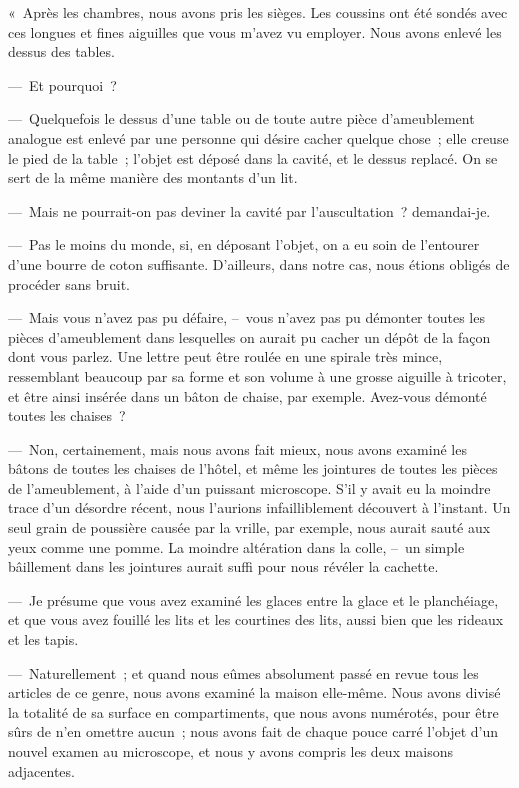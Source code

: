 \documentclass[french,twoside]{book} %
\begin{document}
« Après les chambres, nous avons pris les sièges. Les coussins ont été sondés avec ces longues et fines aiguilles que vous m’avez vu employer. Nous avons enlevé les dessus des tables.\par
— Et pourquoi ?\par
— Quelquefois le dessus d’une table ou de toute autre pièce d’ameublement analogue est enlevé par une personne qui désire cacher quelque chose ; elle creuse le pied de la table ; l’objet est déposé dans la cavité, et le dessus replacé. On se sert de la même manière des montants d’un lit.\par
— Mais ne pourrait-on pas deviner la cavité par l’auscultation ? demandai-je.\par
— Pas le moins du monde, si, en déposant l’objet, on a eu soin de l’entourer d’une bourre de coton suffisante. D’ailleurs, dans notre cas, nous étions obligés de procéder sans bruit.\par
— Mais vous n’avez pas pu défaire, – vous n’avez pas pu démonter toutes les pièces d’ameublement dans lesquelles on aurait pu cacher un dépôt de la façon dont vous parlez. Une lettre peut être roulée en une spirale très mince, ressemblant beaucoup par sa forme et son volume à une grosse aiguille à tricoter, et être ainsi insérée dans un bâton de chaise, par exemple. Avez-vous démonté toutes les chaises ?\par
— Non, certainement, mais nous avons fait mieux, nous avons examiné les bâtons de toutes les chaises de l’hôtel, et même les jointures de toutes les pièces de l’ameublement, à l’aide d’un puissant microscope. S’il y avait eu la moindre trace d’un désordre récent, nous l’aurions infailliblement découvert à l’instant. Un seul grain de poussière causée par la vrille, par exemple, nous aurait sauté aux yeux comme une pomme. La moindre altération dans la colle, – un simple bâillement dans les jointures aurait suffi pour nous révéler la cachette.\par
— Je présume que vous avez examiné les glaces entre la glace et le planchéiage, et que vous avez fouillé les lits et les courtines des lits, aussi bien que les rideaux et les tapis.\par
— Naturellement ; et quand nous eûmes absolument passé en revue tous les articles de ce genre, nous avons examiné la maison elle-même. Nous avons divisé la totalité de sa surface en compartiments, que nous avons numérotés, pour être sûrs de n’en omettre aucun ; nous avons fait de chaque pouce carré l’objet d’un nouvel examen au microscope, et nous y avons compris les deux maisons adjacentes.\par
\end{document}

